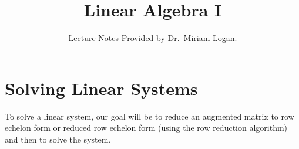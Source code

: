 \documentclass{report}
\begin{document}
\title{Linear Algebra I}
\author{Lecture Notes Provided by Dr.~Miriam Logan.}
\date{}
\maketitle
\tableofcontents
\newpage  

 \section{Solving Linear Systems}
To solve a linear system, our goal will be to reduce an augmented matrix to row echelon form  or reduced row echelon form (using the row reduction algorithm) and then to solve the system.\\
\end{document}

